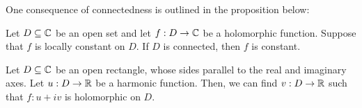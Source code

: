 \documentclass[a4paper]{article}
\begin{document}
One consequence of connectedness is outlined in the proposition below:

\begin{prop}
   Let \( D \subseteq \mathbb{C}   \) be an open set and let \( f: D \to \mathbb{C}  \) be a holomorphic function. Suppose that \( f  \) is locally constant on \( D  \). If \( D  \) is connected, then \( f  \) is constant.
\end{prop}

\begin{theorem}[ ]
    Let \( D \subseteq  \mathbb{C}  \) be an open rectangle, whose sides parallel to the real and imaginary axes. Let \( u : D \to \mathbb{R} \) be a harmonic function. Then, we can find \( v: D \to \mathbb{R}  \) such that \( f: u + iv \) is holomorphic on \( D  \).
\end{theorem}
\end{document}
